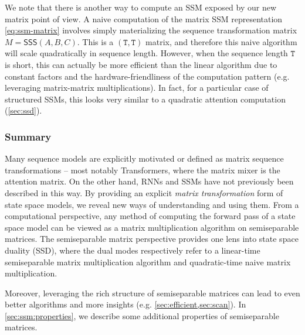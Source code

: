 We note that there is another way to compute an SSM exposed by our new matrix point of view.
A naive computation of the matrix SSM representation \eqref{eq:ssm-matrix} involves simply materializing the sequence transformation matrix $M=\mathsf{SSS}(A, B, C)$.
This is a $\mathtt{(T,T)}$ matrix, and therefore this naive algorithm will scale quadratically in sequence length.
However, when the sequence length $\mathtt{T}$ is short, this can actually be more efficient than the linear algorithm due to constant factors and the hardware-friendliness of the computation pattern (e.g. leveraging matrix-matrix multiplications).
In fact, for a particular case of structured SSMs, this looks very similar to a quadratic attention computation (\cref{sec:ssd}).




\subsubsection{Summary}

Many sequence models are explicitly motivated or defined as matrix sequence transformations --
most notably Transformers, where the matrix mixer is the attention matrix.
On the other hand, RNNs and SSMs have not previously been described in this way.
By providing an explicit \emph{matrix transformation} form of state space models,
we reveal new ways of understanding and using them.
From a computational perspective, any method of computing the forward pass of a state space model can be
viewed as a matrix multiplication algorithm on semiseparable matrices.
The semiseparable matrix perspective provides one lens into state space duality (SSD),
where the dual modes respectively refer to a linear-time semiseparable matrix multiplication algorithm and quadratic-time naive matrix multiplication.

Moreover, leveraging the rich structure of semiseparable matrices can lead to even better algorithms and more insights (e.g. \cref{sec:efficient,sec:scan}).
In \cref{sec:ssm:properties}, we describe some additional properties of semiseparable matrices.


